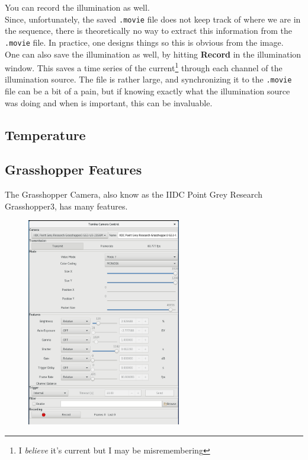 \documentclass{article}
\begin{document}
You can record the illumination as well.\\

Since, unfortunately, the saved \verb|.movie| file does not keep track of where we are in the sequence, there is theoretically no way to extract this information from the \verb|.movie| file. In practice, one designs things so this is obvious from the image.\\

One can also save the illumination as well, by hitting \textbf{Record} in the illumination window. This saves a time series of the current\footnote{I \emph{believe} it's current but I may be misremembering} through each channel of the illumination source. The file is rather large, and synchronizing it to the \verb|.movie| file can be a bit of a pain, but if knowing exactly what the illumination source was doing and when is important, this can be invaluable. 

\newpage

\subsection{Temperature}

\newpage

\subsection{Grasshopper Features}

The Grasshopper Camera, also know as the IIDC Point Grey Research Grasshopper3, has many features.

\begin{figure}[h!]
\centering
\includegraphics[width=0.60\textwidth]{grasshopper}
\end{figure}
\end{document}

